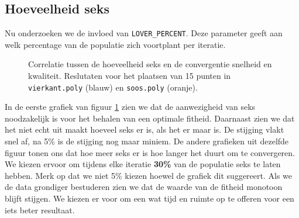 \subsection{Hoeveelheid seks}
Nu onderzoeken we de invloed van \texttt{LOVER\_PERCENT}. Deze parameter geeft aan welk percentage van de populatie zich voortplant per iteratie.
\begin{figure}[H]



\caption{Correlatie tussen de hoeveelheid seks en de convergentie snelheid en kwaliteit. Reslutaten voor het plaatsen van 15 punten in \texttt{vierkant.poly} (blauw) en \texttt{soos.poly} (oranje).}
\label{graf:numLovers}
\end{figure}
In de eerste grafiek van figuur \ref{graf:numLovers} zien we dat de aanwezigheid van seks noodzakelijk is voor het behalen van een optimale fitheid. Daarnaast zien we dat het niet echt uit maakt hoeveel seks er is, als het er maar is. De stijging vlakt snel af, na 5\% is de stijging nog maar miniem. De andere grafieken uit dezelfde figuur tonen ons dat hoe meer seks er is hoe langer het duurt om te convergeren. We kiezen ervoor om tijdens elke iteratie \textbf{30\%} van de populatie seks te laten hebben. Merk op dat we niet 5\% kiezen hoewel de grafiek dit suggereert. Als we de data grondiger bestuderen zien we dat de waarde van de fitheid monotoon blijft stijgen. We kiezen er voor om een wat tijd en ruimte op te offeren voor een iets beter resultaat.




